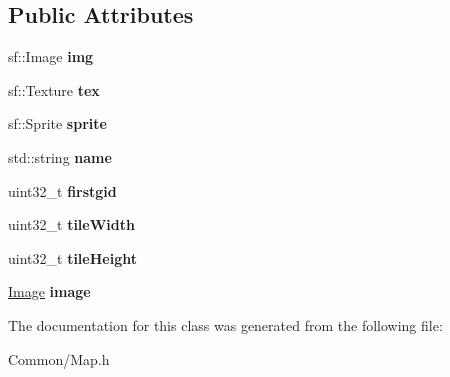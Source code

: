 \subsection*{Public Attributes}
\begin{DoxyCompactItemize}
\item 
\hypertarget{classbali_1_1_map_1_1_tile_set_aab8c962dd6905d837e47e5d332389a4a}{sf\-::\-Image {\bfseries img}}\label{classbali_1_1_map_1_1_tile_set_aab8c962dd6905d837e47e5d332389a4a}

\item 
\hypertarget{classbali_1_1_map_1_1_tile_set_a8ccdef3b5a9f032c61c8421a94551b57}{sf\-::\-Texture {\bfseries tex}}\label{classbali_1_1_map_1_1_tile_set_a8ccdef3b5a9f032c61c8421a94551b57}

\item 
\hypertarget{classbali_1_1_map_1_1_tile_set_a0c1ac3f68090e71455d21bb78c7cd9f5}{sf\-::\-Sprite {\bfseries sprite}}\label{classbali_1_1_map_1_1_tile_set_a0c1ac3f68090e71455d21bb78c7cd9f5}

\item 
\hypertarget{classbali_1_1_map_1_1_tile_set_a838d64ff05fa05b448b0cf11604a9760}{std\-::string {\bfseries name}}\label{classbali_1_1_map_1_1_tile_set_a838d64ff05fa05b448b0cf11604a9760}

\item 
\hypertarget{classbali_1_1_map_1_1_tile_set_a2fa8d66c18db0a74ac9c3a6cd540fd45}{uint32\-\_\-t {\bfseries firstgid}}\label{classbali_1_1_map_1_1_tile_set_a2fa8d66c18db0a74ac9c3a6cd540fd45}

\item 
\hypertarget{classbali_1_1_map_1_1_tile_set_a93b488fcf99b91a00d209e54d4b444e2}{uint32\-\_\-t {\bfseries tile\-Width}}\label{classbali_1_1_map_1_1_tile_set_a93b488fcf99b91a00d209e54d4b444e2}

\item 
\hypertarget{classbali_1_1_map_1_1_tile_set_ac216f7573e2d3303db4f9009b64a4c3f}{uint32\-\_\-t {\bfseries tile\-Height}}\label{classbali_1_1_map_1_1_tile_set_ac216f7573e2d3303db4f9009b64a4c3f}

\item 
\hypertarget{classbali_1_1_map_1_1_tile_set_a2b228cae0967841c599ec605f145619c}{\hyperlink{structbali_1_1_map_1_1_tile_set_1_1_image}{Image} {\bfseries image}}\label{classbali_1_1_map_1_1_tile_set_a2b228cae0967841c599ec605f145619c}

\end{DoxyCompactItemize}


The documentation for this class was generated from the following file\-:\begin{DoxyCompactItemize}
\item 
Common/Map.\-h\end{DoxyCompactItemize}
